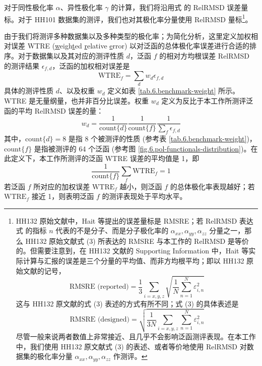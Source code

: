 对于同性极化率 $\alpha$、异性极化率 $\gamma$ 的计算，我们将沿用式  的 RelRMSD 误差量标。对于 HH101 数据集的测评，我们也对其极化率分量使用 RelRMSD 量标\footnote{HH132 原始文献\cite{Hait-Head-Gordon.PCCP.2018}中，Hait 等提出的误差量标是 RMSRE；若 RelRMSD 表达式  的指标 $n$ 代表的不是分子、而是分子极化率的 $\alpha_{xx}, \alpha_{yy}, \alpha_{zz}$ 分量之一，那么 HH132 原始文献式 (3) 所表达的 RMSRE 与本工作的 RelRMSD 是等价的。但需要注意到，在 HH132 文献的 Supporting Information 中，Hait 等实际计算与汇报的误差是三个分量的平均值、而非方均根平均；即以 HH132 原始文献的记号，
$$
\text{RMSRE (reported)} = \frac{1}{3} \sum_{i=x,y,z} \sqrt{\frac{1}{N} \sum_{n=1}^N \varepsilon_{i,n}^2}
$$
这与 HH132 原文献的式 (3) 表述的方式有所不同；式 (3) 的具体表述是
\begin{equation}
    \label{eq.6.rmsre}
    \text{RMSRE (designed)} = \sqrt{\frac{1}{3N} \sum_{i=x,y,z} \sum_{n=1}^N \varepsilon_{i,n}^2}
\end{equation}
尽管一般来说两者数值上非常接近、且几乎不会影响泛函测评表现。在本工作中，我们使用 HH132 原文献式 (3) 的表述、或者等价地使用 RelRMSD 对数据集的极化率分量 $\alpha_{xx}, \alpha_{yy}, \alpha_{zz}$ 作测评。
}。

由于我们将测评多种数据集以及多种类型的极化率；为简化分析，这里定义加权相对误差 WTRE (\underline{w}eigh\underline{t}ed \underline{r}elative \underline{e}rror) 以对泛函的总体极化率误差进行合适的排序。对于数据集以及其对应的测评性质 $d$，泛函 $f$ 的相对方均根误差 RelRMSD 的测评结果 $\epsilon_{f,d}$，泛函的加权相对误差是
\begin{equation}
    \label{eq.6.wtre}
    \mathrm{WTRE}_f = \sum_d w_d \epsilon_{f,d}
\end{equation}
具体的测评性质 $d$、以及权重 $w_d$ 定义如表 \ref{tab.6.benchmark-weight} 所示。WTRE 是无量纲量，也并非百分比误差。权重 $w_d$ 定义为反比于本工作所测评泛函的平均 RelRMSD 误差的量：
\begin{equation}
    w_d = \frac{1}{\mathrm{count} \{ d \}} \frac{1}{\mathrm{count} \{ f \}} \frac{1}{\displaystyle \sum_{f} \epsilon_{f,d}}
\end{equation}
其中，$\mathrm{count} \{ d \} = 8$ 是指 8 个被测评的性质 (参考表 \ref{tab.6.benchmark-weight})，$\mathrm{count} \{ f \}$ 是指被测评的 64 个泛函 (参考图 \ref{fig.6.pol-functionals-distribution})。在此定义下，本工作所测评的泛函 WTRE 误差的平均值是 1，即
\begin{equation*}
    \frac{1}{\mathrm{count} \{ f \}} \sum_f \mathrm{WTRE}_f = 1
\end{equation*}
若泛函 $f$ 所对应的加权误差 $\mathrm{WTRE}_f$ 越小，则泛函 $f$ 的总体极化率表现越好；若 $\mathrm{WTRE}_f$ 接近 1，则表明泛函 $f$ 的测评表现处于平均水平。

